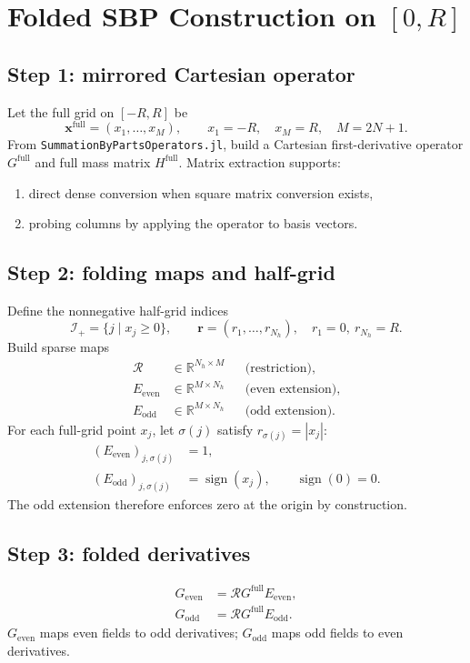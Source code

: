 \documentclass[
  aps,
  pre,
  reprint,
  superscriptaddress,
  nofootinbib
]{revtex4-2}
\newcommand{\RR}{\mathbb{R}}
\newcommand{\Rmat}{\mathcal{R}}
\newcommand{\Ee}{E_{\mathrm{even}}}
\newcommand{\Eo}{E_{\mathrm{odd}}}
\newcommand{\Ge}{G_{\mathrm{even}}}
\newcommand{\Go}{G_{\mathrm{odd}}}
\begin{document}
\section{Folded SBP Construction on \texorpdfstring{$[0,R]$}{[0,R]}}
\subsection{Step 1: mirrored Cartesian operator}
Let the full grid on $[-R,R]$ be
\begin{equation}
\bm{x}^{\mathrm{full}}=(x_1,\ldots,x_M),\qquad x_1=-R,\quad x_M=R,\quad M=2N+1.
\end{equation}
From \texttt{SummationByPartsOperators.jl}, build a Cartesian first-derivative operator
$G^{\mathrm{full}}$ and full mass matrix $H^{\mathrm{full}}$. Matrix extraction supports:
\begin{enumerate}
  \item direct dense conversion when square matrix conversion exists,
  \item probing columns by applying the operator to basis vectors.
\end{enumerate}

\subsection{Step 2: folding maps and half-grid}
Define the nonnegative half-grid indices
\begin{equation}
\mathcal{I}_{+}=\{j \mid x_j\ge 0\},\qquad \bm{r}=(r_1,\ldots,r_{N_h}),\quad r_1=0,\ r_{N_h}=R.
\end{equation}
Build sparse maps
\begin{align}
\Rmat &\in \RR^{N_h\times M} &&\text{(restriction)},\\
\Ee &\in \RR^{M\times N_h} &&\text{(even extension)},\\
\Eo &\in \RR^{M\times N_h} &&\text{(odd extension)}.
\end{align}
For each full-grid point $x_j$, let $\sigma(j)$ satisfy $r_{\sigma(j)}=|x_j|$:
\begin{align}
(\Ee)_{j,\sigma(j)} &= 1,\\
(\Eo)_{j,\sigma(j)} &= \operatorname{sign}(x_j),\qquad \operatorname{sign}(0)=0.
\end{align}
The odd extension therefore enforces zero at the origin by construction.

\subsection{Step 3: folded derivatives}
\begin{align}
\Ge &= \Rmat G^{\mathrm{full}}\Ee,\\
\Go &= \Rmat G^{\mathrm{full}}\Eo.
\end{align}
$\Ge$ maps even fields to odd derivatives; $\Go$ maps odd fields to even derivatives.
\end{document}

